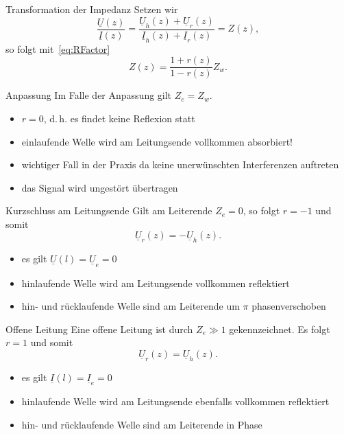 \documentclass{beamer}
\begin{document}
\begin{frame}{Transformation der Impedanz}
Setzen wir
\[
\frac{\underline{U}(z)}{\underline{I}(z)}
= \frac{\underline{U}_{h}(z) +
\underline{U}_{r}(z)}{\underline{I}_{h}(z) +
    \underline{I}_{r}(z)} = Z(z),
\]
so folgt mit~\eqref{eq:RFactor}
\[
Z(z) = \frac{1 + r(z)}{1 - r(z)} Z_{w}.
\]
\end{frame}


\begin{frame}{Anpassung}
Im Falle der Anpassung gilt $Z_{e} = Z_{w}$.
\begin{itemize}
    \item <1-> $r = 0$, d.\,h. es findet keine Reflexion statt
    \item <2-> einlaufende Welle wird am Leitungsende vollkommen absorbiert!
    \item <3-> wichtiger Fall in der Praxis da keine unerwünschten Interferenzen auftreten
    \item <4-> das Signal wird ungestört übertragen
\end{itemize}
\end{frame}


\begin{frame}{Kurzschluss am Leitungsende}
Gilt am Leiterende $Z_{e} = 0$, so folgt $r = -1$ und somit
\[
\underline{U}_{r}(z) = - \underline{U}_{h}(z).
\]

\begin{itemize}
    \item<2-> es gilt $\underline{U}(l) = \underline{U}_{e} = 0$
    \item<3-> hinlaufende Welle wird am Leitungsende vollkommen reflektiert
    \item<4-> hin- und rücklaufende Welle sind am Leiterende um $\pi$ phasenverschoben
\end{itemize}

\end{frame}


\begin{frame}{Offene Leitung}
Eine offene Leitung ist durch $Z_{e} \gg 1$ gekennzeichnet. Es folgt $r = 1$ und somit
\[
\underline{U}_{r}(z) = \underline{U}_{h}(z).
\]

\begin{itemize}
    \item<2-> es gilt $\underline{I}(l) = \underline{I}_{e} = 0$
    \item<3-> hinlaufende Welle wird am Leitungsende ebenfalls vollkommen reflektiert
    \item<4-> hin- und rücklaufende Welle sind am Leiterende in Phase
\end{itemize}

\end{frame}
\end{document}
